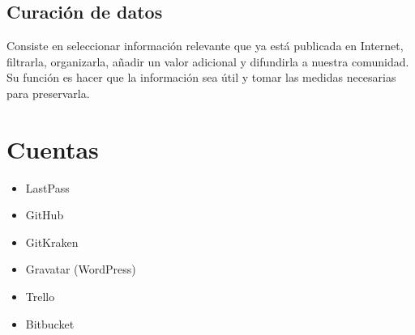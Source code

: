 \documentclass[12pt,letterpaper]{article}
\begin{document}
\subsection*{Curación de datos}
Consiste en seleccionar informaci\'on relevante que ya está publicada en
Internet, filtrarla, organizarla, añadir un valor adicional y difundirla a
nuestra comunidad.
\citep{DuroCur}
Su función es hacer que la información sea útil y tomar las medidas necesarias
para preservarla.
\citep{ItCur}

\section{Cuentas}
\begin{itemize}
\item LastPass
\item GitHub
\item GitKraken
\item Gravatar (WordPress)
\item Trello
\item Bitbucket
\end{itemize}

 

\end{document}
